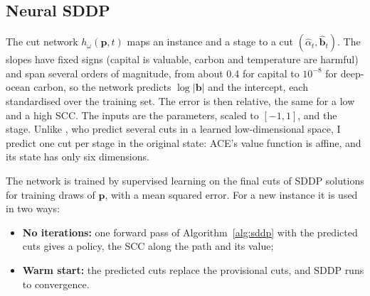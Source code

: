 \subsection{Neural SDDP}

The cut network $h_\omega(\bm{p}, t)$ maps an instance and a stage to a cut $(\hat\alpha_t, \hat{\bm{b}}_t)$. The slopes have fixed signs (capital is valuable, carbon and temperature are harmful) and span several orders of magnitude, from about 0.4 for capital to $10^{-8}$ for deep-ocean carbon, so the network predicts $\log|\bm{b}|$ and the intercept, each standardised over the training set. The error is then relative, the same for a low and a high SCC. The inputs are the parameters, scaled to $[-1, 1]$, and the stage. Unlike \textcite{Dai2022NeuralSDDP}, who predict several cuts in a learned low-dimensional space, I predict one cut per stage in the original state: ACE's value function is affine, and its state has only six dimensions.

The network is trained by supervised learning on the final cuts of SDDP solutions for training draws of $\bm{p}$, with a mean squared error. For a new instance it is used in two ways:
\begin{itemize}
    \item \textbf{No iterations:} one forward pass of Algorithm~\ref{alg:sddp} with the predicted cuts gives a policy, the SCC along the path and its value;
    \item \textbf{Warm start:} the predicted cuts replace the provisional cuts, and SDDP runs to convergence.
\end{itemize}
